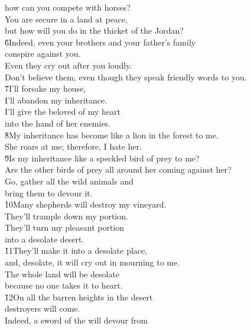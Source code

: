 \begin{poetry}
\poemlll       how can you compete with horses? \\
\poeml You are secure in a land at peace, \\
\poemll    but how will you do in the thicket of the Jordan? \\
\poeml \v{6}Indeed, even your brothers and your father's family \\
\poemll    conspire against you. \\
\poeml Even they cry out after you loudly. \\
\poemll    Don't believe them, even though they speak friendly words to you. \\
\poeml \v{7}I'll forsake my house, \\
\poemll    I'll abandon my inheritance. \\
\poeml I'll give the beloved of my heart \\
\poemll    into the hand of her enemies. \\
\poeml \v{8}My inheritance has become like a lion in the forest to me. \\
\poemll    She roars at me; therefore, I hate her. \\
\poeml \v{9}Is my inheritance like a speckled bird of prey to me? \\
\poemll    Are the other birds of prey all around her coming against her? \\
\poeml Go, gather all the wild animals and \\
\poemll    bring them to devour it. \\
\poeml \v{10}Many shepherds will destroy my vineyard. \\
\poemll    They'll trample down my portion. \\
\poeml They'll turn my pleasant portion \\
\poemll    into a desolate desert. \\
\poeml \v{11}They'll make it into a desolate place, \\
\poemll    and, desolate, it will cry out in mourning to me. \\
\poeml The whole land will be desolate \\
\poemll    because no one takes it to heart. \\
\poeml \v{12}On all the barren heights in the desert \\
\poemll    destroyers will come. \\
\poeml Indeed, a sword of the  will devour from \\

\end{poetry}
